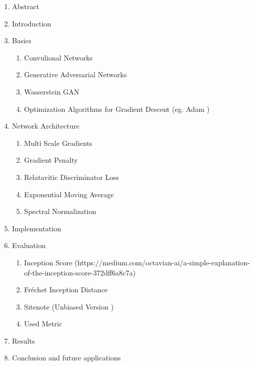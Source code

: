 \documentclass[conference,onecolumn,compsoc]{IEEEtran}
\begin{document}
\noindent
\begin{enumerate}
  \item Abstract
  \item Introduction
  \item Basics
  \begin{enumerate}
    \item Convulional Networks 
    \item Generative Adversarial Networks \cite{goodfellow2014generative}
    \item Wasserstein GAN \cite{arjovsky2017wasserstein}
    \item Optimization Algorithms for Gradient Descent (eg. Adam \cite{kingma2017adam})
  \end{enumerate}
  \item Network Architecture
  \begin{enumerate}
    \item Multi Scale Gradients \cite{karnewar2020msggan}
    \item Gradient Penalty \cite{arjovsky2017wasserstein,gulrajani2017improved}
    \item Relatavitic Discriminator Loss \cite{jolicoeurmartineau2018relativistic}
    \item Exponential Moving Average \cite{yazıcı2019unusual}
    \item Spectral Normalization \cite{miyato2018spectral}
  \end{enumerate}
  \item Implementation
  \item Evaluation
  \begin{enumerate}
    \item Inception Score \cite{salimans2016improved} (https://medium.com/octavian-ai/a-simple-explanation-of-the-inception-score-372dff6a8c7a)
    \item Fréchet Inception Distance \cite{heusel2018gans}
    \item Sitenote (Unbiased Version \cite{chong2020effectively})
    \item Used Metric
  \end{enumerate}
  \item Results
  \item Conclusion and future applications
\end{enumerate}


\newpage


\printbibliography
\end{document}
